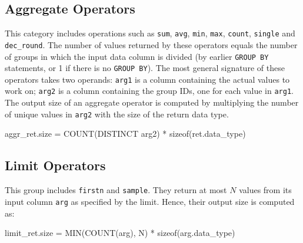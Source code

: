 \documentclass[conference]{IEEEtran}
\def\Skip{\par\medskip\nobreak\noindent}
\begin{document}
\subsection{Aggregate Operators}
This category includes operations such as \texttt{\small sum}, \texttt{\small avg}, \texttt{\small min}, \texttt{\small max}, \texttt{\small count}, \texttt{\small single} and \texttt{\small dec\_round}.
The number of values returned by these operators equals the number of groups in which the input data column is divided (by earlier \texttt{\small GROUP BY} statements, or 1 if there is no \texttt{\small GROUP BY}).
The most general signature of these operators takes two operands: \texttt{\small arg1} is a column containing the actual values to work on; \texttt{\small arg2} is a column containing the group IDs, one for each value in \texttt{\small arg1}.
The output size of an aggregate operator is computed by multiplying the number of unique values in \texttt{\small arg2} with the size of the return data type.
\begin{verb}
aggr_ret.size = COUNT(DISTINCT arg2) * sizeof(ret.data_type)
\end{verb}

\subsection{Limit Operators}
This group includes \texttt{\small firstn} and \texttt{\small sample}.
They return at most $N$ values from its input column \texttt{\small arg} as specified by the limit.
Hence, their output size is computed as:
\begin{verb}
limit_ret.size = MIN(COUNT(arg), N) * sizeof(arg.data_type)
\end{verb}
\end{document}
